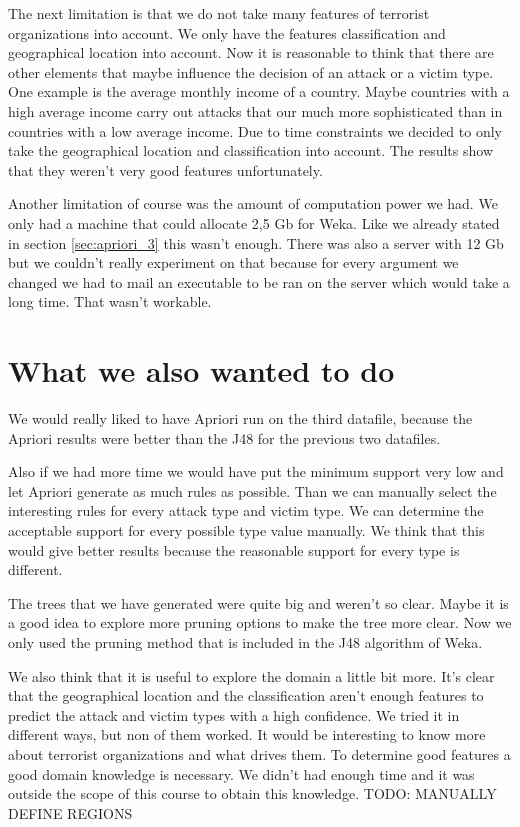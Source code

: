 \documentclass[a4]{article}
\begin{document}
The next limitation is that we do not take many features of terrorist organizations into account. We only have the features classification and geographical location into account. Now it is reasonable to think that there are other elements that maybe influence the decision of an attack or a victim type. One example is the average monthly income of a country. Maybe countries with a high average income carry out attacks that our much more sophisticated than in countries with a low average income. Due to time constraints we decided to only take the geographical location and classification into account. The results show that they weren't very good features unfortunately.\par
Another limitation of course was the amount of computation power we had. We only had a machine that could allocate 2,5 Gb for Weka. Like we already stated in section \ref{sec:apriori_3} this wasn't enough. There was also a server with 12 Gb but we couldn't really experiment on that because for every argument we changed we had to mail an executable to be ran on the server which would take a long time. That wasn't workable.
\section{What we also wanted to do}
We would really liked to have Apriori run on the third datafile, because the Apriori results were better than the J48 for the previous two datafiles.\par Also if we had more time we would have put the minimum support very low and let Apriori generate as much rules as possible. Than we can manually select the interesting rules for every attack type and victim type. We can determine the acceptable support for every possible type value manually. We think that this would give better results because the reasonable support for every type is different.\par
The trees that we have generated were quite big and weren't so clear. Maybe it is a good idea to explore more pruning options to make the tree more clear. Now we only used the pruning method that is included in the J48 algorithm of Weka.\par
We also think that it is useful to explore the domain a little bit more. It's clear that the geographical location and the classification aren't enough features to predict the attack and victim types with a high confidence. We tried it in different ways, but non of them worked. It would be interesting to know more about terrorist organizations and what drives them. To determine good features a good domain knowledge is necessary. We didn't had enough time and it was outside the scope of this course to obtain this knowledge.
TODO: MANUALLY DEFINE REGIONS
\end{document}
